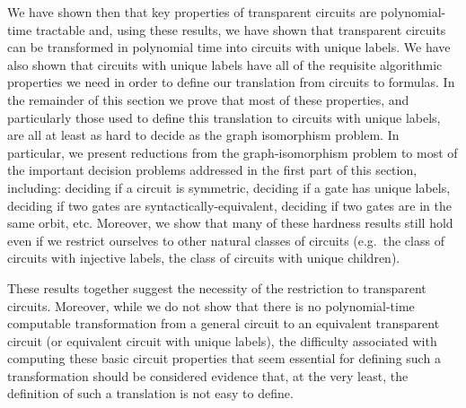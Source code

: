 \documentclass[../paper.tex]{subfiles}
\begin{document}

We have shown then that key properties of transparent circuits are
polynomial-time tractable and, using these results, we have shown that
transparent circuits can be transformed in polynomial time into circuits with
unique labels. We have also shown that circuits with unique labels have all of
the requisite algorithmic properties we need in order to define our translation
from circuits to formulas. In the remainder of this section we prove that most
of these properties, and particularly those used to define this translation to
circuits with unique labels, are all at least as hard to decide as the graph
isomorphism problem. In particular, we present reductions from the
graph-isomorphism problem to most of the important decision problems addressed
in the first part of this section, including: deciding if a circuit is
symmetric, deciding if a gate has unique labels, deciding if two gates are
syntactically-equivalent, deciding if two gates are in the same orbit, etc.
Moreover, we show that many of these hardness results still hold even if we
restrict ourselves to other natural classes of circuits (e.g.\ the class of
circuits with injective labels, the class of circuits with unique children).

These results together suggest the necessity of the restriction to transparent
circuits. Moreover, while we do not show that there is no polynomial-time
computable transformation from a general circuit to an equivalent transparent
circuit (or equivalent circuit with unique labels), the difficulty associated
with computing these basic circuit properties that seem essential for defining
such a transformation should be considered evidence that, at the very least, the
definition of such a translation is not easy to define. 

\end{document}
